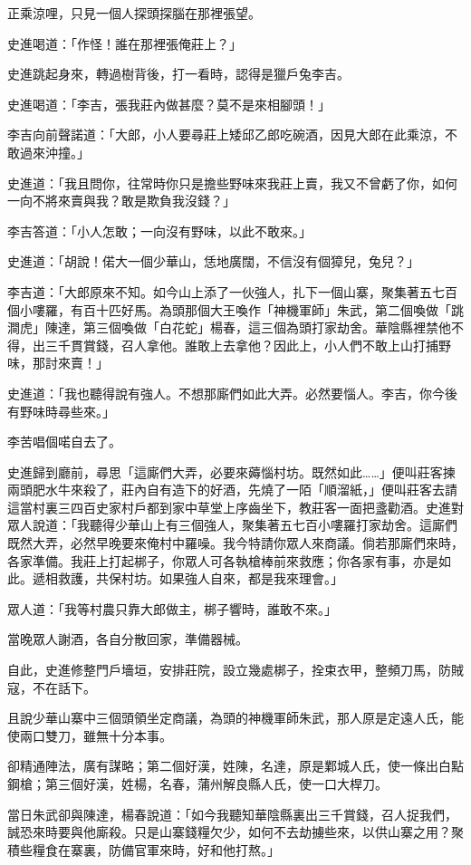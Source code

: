 \documentclass[11pt,a4paper]{article}
\begin{document}
正乘涼哩，只見一個人探頭探腦在那裡張望。

史進喝道：「作怪！誰在那裡張俺莊上？」

史進跳起身來，轉過樹背後，打一看時，認得是獵戶兔李吉。

史進喝道：「李吉，張我莊內做甚麼？莫不是來相腳頭！」

李吉向前聲諾道：「大郎，小人要尋莊上矮邱乙郎吃碗酒，因見大郎在此乘涼，不敢過來沖撞。」

史進道：「我且問你，往常時你只是擔些野味來我莊上賣，我又不曾虧了你，如何一向不將來賣與我？敢是欺負我沒錢？」

李吉答道：「小人怎敢；一向沒有野味，以此不敢來。」

史進道：「胡說！偌大一個少華山，恁地廣闊，不信沒有個獐兒，兔兒？」

李吉道：「大郎原來不知。如今山上添了一伙強人，扎下一個山寨，聚集著五七百個小嘍羅，有百十匹好馬。為頭那個大王喚作「神機軍師」朱武，第二個喚做「跳澗虎」陳達，第三個喚做「白花蛇」楊春，這三個為頭打家劫舍。華陰縣裡禁他不得，出三千貫賞錢，召人拿他。誰敢上去拿他？因此上，小人們不敢上山打捕野味，那討來賣！」

史進道：「我也聽得說有強人。不想那廝們如此大弄。必然要惱人。李吉，你今後有野味時尋些來。」

李苦唱個喏自去了。

史進歸到廳前，尋思「這廝們大弄，必要來薅惱村坊。既然如此……」便叫莊客揀兩頭肥水牛來殺了，莊內自有造下的好酒，先燒了一陌「順溜紙，」便叫莊客去請這當村裏三四百史家村戶都到家中草堂上序齒坐下，教莊客一面把盞勸酒。史進對眾人說道：「我聽得少華山上有三個強人，聚集著五七百小嘍羅打家劫舍。這廝們既然大弄，必然早晚要來俺村中羅噪。我今特請你眾人來商議。倘若那廝們來時，各家準備。我莊上打起梆子，你眾人可各執槍棒前來救應；你各家有事，亦是如此。遞相救護，共保村坊。如果強人自來，都是我來理會。」

眾人道：「我等村農只靠大郎做主，梆子響時，誰敢不來。」

當晚眾人謝酒，各自分散回家，準備器械。

自此，史進修整門戶墻垣，安排莊院，設立幾處梆子，拴束衣甲，整頻刀馬，防賊寇，不在話下。

且說少華山寨中三個頭領坐定商議，為頭的神機軍師朱武，那人原是定遠人氏，能使兩口雙刀，雖無十分本事。

卻精通陣法，廣有謀略；第二個好漢，姓陳，名達，原是鄴城人氏，使一條出白點鋼槍；第三個好漢，姓楊，名春，蒲州解良縣人氏，使一口大桿刀。

當日朱武卻與陳達，楊春說道：「如今我聽知華陰縣裏出三千賞錢，召人捉我們，誠恐來時要與他廝殺。只是山寨錢糧欠少，如何不去劫擄些來，以供山寨之用？聚積些糧食在寨裏，防備官軍來時，好和他打熬。」
\end{document}
